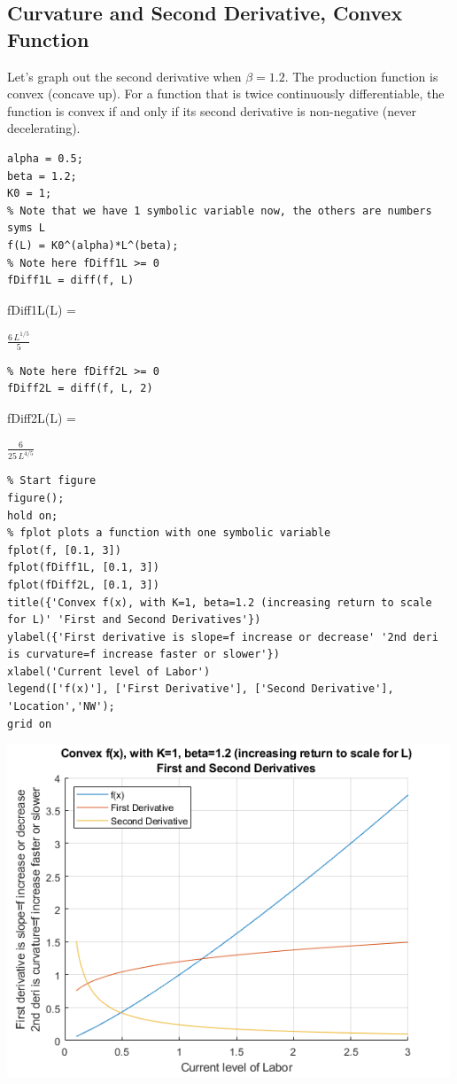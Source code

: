 \documentclass[
]{book}
\begin{document}
\hypertarget{curvature-and-second-derivative-convex-function}{%
\subsection{Curvature and Second Derivative, Convex Function}\label{curvature-and-second-derivative-convex-function}}

Let's graph out the second derivative when \(\beta =1.2\). The production
function is convex (concave up). For a function that is twice
continuously differentiable, the function is convex if and only if its
second derivative is non-negative (never decelerating).

\begin{verbatim}
alpha = 0.5;
beta = 1.2;
K0 = 1;
% Note that we have 1 symbolic variable now, the others are numbers
syms L
f(L) = K0^(alpha)*L^(beta);
% Note here fDiff1L >= 0
fDiff1L = diff(f, L)
\end{verbatim}

fDiff1L(L) =

\(\displaystyle \frac{6\,L^{1/5} }{5}\)

\begin{verbatim}
% Note here fDiff2L >= 0
fDiff2L = diff(f, L, 2)
\end{verbatim}

fDiff2L(L) =

\(\displaystyle \frac{6}{25\,L^{4/5} }\)

\begin{verbatim}
% Start figure
figure();
hold on;
% fplot plots a function with one symbolic variable
fplot(f, [0.1, 3])
fplot(fDiff1L, [0.1, 3])
fplot(fDiff2L, [0.1, 3])
title({'Convex f(x), with K=1, beta=1.2 (increasing return to scale for L)' 'First and Second Derivatives'})
ylabel({'First derivative is slope=f increase or decrease' '2nd deri is curvature=f increase faster or slower'})
xlabel('Current level of Labor')
legend(['f(x)'], ['First Derivative'], ['Second Derivative'], 'Location','NW');
grid on
\end{verbatim}

\includegraphics[width=5.20833in,height=\textheight]{img/second_derivative_images/figure_1.png}
\end{document}
